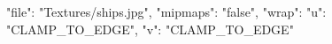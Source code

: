 {
  "file": "Textures/ships.jpg",
  "mipmaps": "false",
  "wrap": {
    "u": "CLAMP_TO_EDGE",
    "v": "CLAMP_TO_EDGE"
  }
}